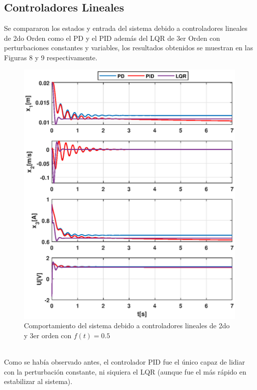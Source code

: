 \documentclass[onecolumn,10pt]{article}
\begin{document}
\subsection*{Controladores Lineales}
Se compararon los estados y entrada del sistema debido a controladores lineales de 2do Orden como el PD y el PID adem\'as del LQR de 3er Orden con perturbaciones constantes y variables, los resultados obtenidos se muestran en las Figuras 8 y 9 respectivamente.
\begin{figure}[!h]
\centering
\includegraphics[scale=0.55]{xu_3o_pdpidlqr_pc.eps}
\caption{Comportamiento del sistema debido a controladores lineales de 2do y 3er orden con $f(t)=0.5$}
\end{figure}
\\
Como se hab\'ia observado antes, el controlador PID fue el \'unico capaz de lidiar con la perturbaci\'on constante, ni siquiera el LQR (aunque fue el m\'as r\'apido en estabilizar al sistema). 
\end{document}

